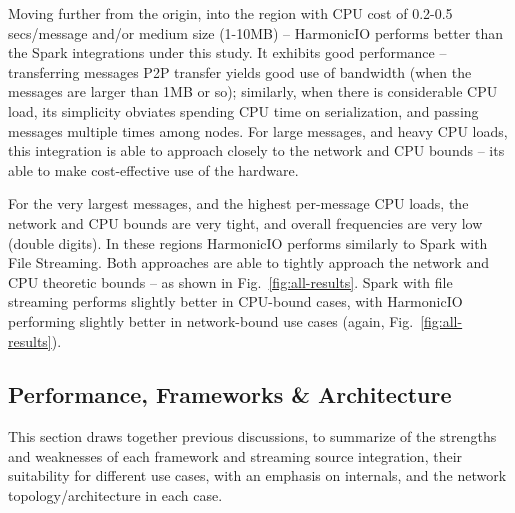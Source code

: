 \documentclass[letterpaper,conference]{IEEEtran}
\begin{document}

Moving further from the origin, into the region with CPU cost of 0.2-0.5 secs/message and/or medium size (1-10MB) -- HarmonicIO performs better than the Spark integrations under this study. 
It exhibits good performance -- transferring messages P2P transfer yields good use of bandwidth (when the messages are larger than 1MB or so); 
similarly, when there is considerable CPU load, its simplicity obviates spending CPU time on serialization, and passing messages multiple times among nodes. %
For large messages, and heavy CPU loads, this integration is able to approach closely to the network and CPU bounds -- its able to make cost-effective use of the hardware.

For the very largest messages, and the highest per-message CPU loads, the network and CPU bounds are very tight, and overall frequencies are very low (double digits). In these regions HarmonicIO performs similarly to Spark with File Streaming. Both approaches are able to tightly approach the network and CPU theoretic bounds -- as shown in Fig.~\ref{fig:all-results}. Spark with file streaming performs slightly better in CPU-bound cases, with HarmonicIO performing slightly better in network-bound use cases (again, Fig.~\ref{fig:all-results}). 

\subsection{Performance, Frameworks \& Architecture}

This section draws together previous discussions, to summarize of the strengths and weaknesses of each framework and streaming source integration, their suitability for different use cases, with an emphasis on internals, and the network topology/architecture in each case. 
\end{document}
